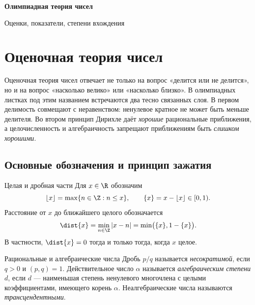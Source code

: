 \begin{titlepage}
  \thispagestyle{firststyle}
  \centering
  \vspace*{22mm}
  {\sffamily\bfseries\color{Navy}\fontsize{29}{34}\selectfont
    Олимпиадная теория чисел\par}
  \vspace{5mm}
  {\sffamily\fontsize{18}{23}\selectfont
    Оценки, показатели, степени вхождения\par}
  \vspace{12mm}

  \vspace{12mm}
  \vfill
  \vspace*{18mm}
\end{titlepage}

\clearpage
{}
\thispagestyle{plain}
\begingroup
\setlength{\parskip}{0pt}
\tableofcontents
\endgroup

\chapter{Оценочная теория чисел}

Оценочная теория чисел отвечает не только на вопрос
«делится или не делится», но и на вопрос «насколько велико» или
«насколько близко». В олимпиадных листках под этим названием встречаются
два тесно связанных слоя. В первом делимость совмещают с неравенством:
ненулевое кратное не может быть меньше делителя. Во втором принцип
Дирихле даёт \emph{хорошие} рациональные приближения, а
целочисленность и алгебраичность запрещают приближениям быть
\emph{слишком хорошими}.

\section{Основные обозначения и принцип зажатия}

\begin{definitionbox}{Целая и дробная части}
Для $x\in\R$ обозначим
\[
  \lfloor x\rfloor=\max\{n\in\Z:n\le x\},
  \qquad
  \{x\}=x-\lfloor x\rfloor\in[0,1).
\]
Расстояние от $x$ до ближайшего целого обозначается
\[
  \dist{x}=\min_{n\in\Z}|x-n|
  =\min\bigl(\{x\},1-\{x\}\bigr).
\]
В частности, $\dist{x}=0$ тогда и только тогда, когда $x$ целое.
\end{definitionbox}

\begin{definitionbox}{Рациональные и алгебраические числа}
Дробь $p/q$ называется \emph{несократимой}, если $q>0$ и
$(p,q)=1$. Действительное число $\alpha$ называется
\emph{алгебраическим степени $d$}, если $d$ --- наименьшая степень
ненулевого многочлена с целыми коэффициентами, имеющего корень
$\alpha$. Неалгебраические числа называются \emph{трансцендентными}.
\end{definitionbox}


